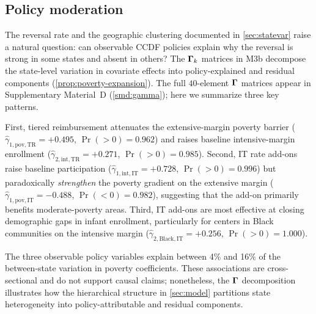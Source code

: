 
\subsection{Policy moderation}\label{sec:policyresults}

The reversal rate and the geographic clustering documented in
\cref{sec:statevar} raise a natural question: can observable CCDF policies
explain why the reversal is strong in some states and absent in
others?  The $\boldsymbol{\Gamma}_k$ matrices in M3b decompose the state-level
variation in covariate effects into policy-explained and residual
components (\cref{prop:poverty-expansion}).  The full $40$-element
$\boldsymbol{\Gamma}$ matrices appear in Supplementary Material~D
(\cref{smd:gamma}); here we summarize three key patterns.

First, tiered reimbursement attenuates the extensive-margin poverty
barrier ($\hat{\gamma}_{1,\mathrm{pov},\mathrm{TR}} = +0.495$,
$\Pr(>0) = 0.962$) and raises baseline intensive-margin enrollment
($\hat{\gamma}_{2,\mathrm{int},\mathrm{TR}} = +0.271$,
$\Pr(>0) = 0.985$).  Second, IT rate add-ons raise baseline
participation ($\hat{\gamma}_{1,\mathrm{int},\mathrm{IT}} = +0.728$,
$\Pr(>0) = 0.996$) but paradoxically \emph{strengthen} the poverty
gradient on the extensive margin
($\hat{\gamma}_{1,\mathrm{pov},\mathrm{IT}} = -0.488$,
$\Pr(<0) = 0.982$), suggesting that the add-on primarily benefits
moderate-poverty areas.  Third, IT add-ons are most effective at closing
demographic gaps in infant enrollment, particularly for centers in Black
communities on the intensive margin
($\hat{\gamma}_{2,\mathrm{Black},\mathrm{IT}} = +0.256$,
$\Pr(>0) = 1.000$).

The three observable policy variables explain between 4\% and 16\% of
the between-state variation in poverty coefficients.  These associations
are cross-sectional and do not support causal claims; nonetheless, the
$\boldsymbol{\Gamma}$ decomposition illustrates how the hierarchical structure in
\cref{sec:model} partitions state heterogeneity into policy-attributable
and residual components.
